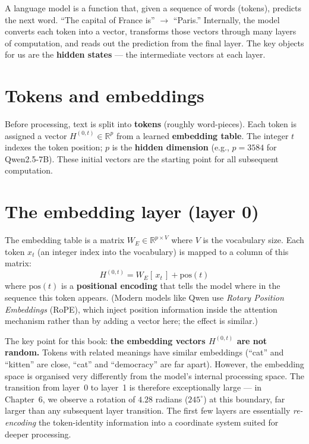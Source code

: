 \documentclass[11pt, twoside, openright]{memoir}
\begin{document}
A language model is a function that, given a sequence of words (tokens),
predicts the next word.  ``The capital of France is'' $\to$ ``Paris.''
Internally, the model converts each token into a vector, transforms
those vectors through many layers of computation, and reads out the
prediction from the final layer.  The key objects for us are the
\textbf{hidden states} --- the intermediate vectors at each layer.

\section{Tokens and embeddings}

Before processing, text is split into \textbf{tokens} (roughly
word-pieces).  Each token is assigned a vector $H^{(0,t)} \in
\mathbb{R}^p$ from a learned \textbf{embedding table}.  The integer
$t$ indexes the token position; $p$ is the \textbf{hidden dimension}
(e.g., $p = 3584$ for Qwen2.5-7B).  These initial vectors are the
starting point for all subsequent computation.

\section{The embedding layer (layer 0)}

The embedding table is a matrix $W_E \in \mathbb{R}^{p \times V}$
where $V$ is the vocabulary size.  Each token $x_t$ (an integer index
into the vocabulary) is mapped to a column of this matrix:
\[
  H^{(0,t)} = W_E[\,x_t\,] + \mathrm{pos}(t)
\]
where $\mathrm{pos}(t)$ is a \textbf{positional encoding} that tells
the model where in the sequence this token appears.  (Modern models
like Qwen use \emph{Rotary Position Embeddings} (RoPE), which inject
position information inside the attention mechanism rather than by
adding a vector here; the effect is similar.)

The key point for this book: \textbf{the embedding vectors
$H^{(0,t)}$ are not random.}  Tokens with related meanings have
similar embeddings (``cat'' and ``kitten'' are close, ``cat'' and
``democracy'' are far apart).  However, the embedding space is
organised very differently from the model's internal processing
space.  The transition from layer~0 to layer~1 is therefore
exceptionally large --- in Chapter~6, we observe a rotation of
$4.28$ radians ($245^\circ$) at this boundary, far larger than any
subsequent layer transition.  The first few layers are essentially
\emph{re-encoding} the token-identity information into a coordinate
system suited for deeper processing.
\end{document}
